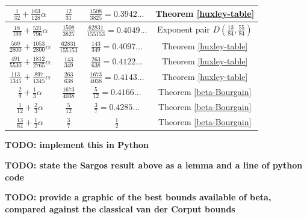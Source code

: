 \begin{table}[ht]
\begin{tabular}{|c|c|c|c|}
    \hline
    $ \frac{1}{32} + \frac{103}{128} \alpha $ & $ \frac{12}{31} $ & $ \frac{1508}{3825} = 0.3942\ldots $ & Theorem \ref{huxley-table}\\
    \hline
    $ \frac{18}{199} + \frac{521}{796} \alpha $ & $ \frac{1508}{3825} $ & $ \frac{62831}{155153} = 0.4049\ldots $ & Exponent pair $D(\frac{13}{84}, \frac{55}{84})$\\
    \hline
    $ \frac{569}{2800} + \frac{1053}{2800} \alpha $ & $ \frac{62831}{155153} $ & $ \frac{143}{349} = 0.4097\ldots $ & Theorem \ref{huxley-table}\\
    \hline
    $ \frac{491}{5530} + \frac{1812}{2765} \alpha $ & $ \frac{143}{349} $ & $ \frac{263}{638} = 0.4122\ldots $ & Theorem \ref{huxley-table}\\
    \hline
    $ \frac{113}{1345} + \frac{897}{1345} \alpha $ & $ \frac{263}{638} $ & $ \frac{1673}{4038} = 0.4143\ldots $ &Theorem \ref{huxley-table}\\
    \hline
    $ \frac{2}{9} + \frac{1}{3} \alpha $ & $ \frac{1673}{4038} $ & $ \frac{5}{12} = 0.4166\ldots $ & Theorem \ref{beta-Bourgain}\\
    \hline
    $ \frac{1}{12} + \frac{2}{3} \alpha $ & $ \frac{5}{12} $ & $ \frac{3}{7} = 0.4285\ldots $ & Theorem \ref{beta-Bourgain}\\
    \hline
    $ \frac{13}{84} + \frac{1}{2} \alpha $ & $ \frac{3}{7} $ & $ \frac{1}{2}$ & Theorem \ref{beta-Bourgain}\\
    \hline
    \end{tabular}
    \label{huxley_table_ranges}
    \end{table}

{\bf TODO: implement this in Python}

{\bf TODO: state the Sargos result above as a lemma and a line of python code}

{\bf TODO: provide a graphic of the best bounds available of beta, compared against the classical van der Corput bounds}
